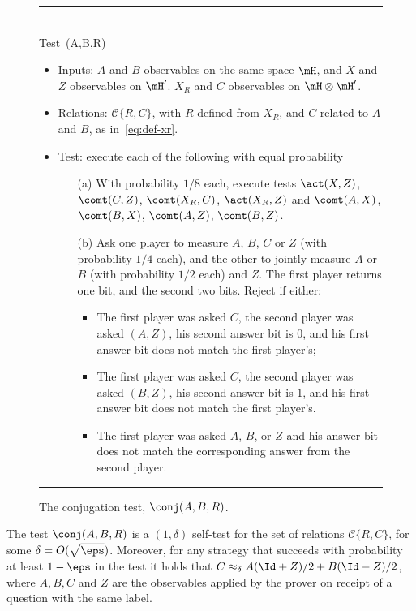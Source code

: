 \begin{figure}[H]
\rule[1ex]{16.5cm}{0.5pt}\\
Test~\conj(A,B,R) 
\begin{itemize}
    \item Inputs: $A$ and $B$ observables on the same space $\mH$, and $X$ and $Z$ observables on $\mH'$. $X_R$ and $C$ observables on $\mH\otimes \mH'$.
    \item Relations:  $\mathcal{C}\{R,C\} $, with $R$ defined from $X_R$, and $C$ related to $A$ and $B$, as in~\eqref{eq:def-xr}. 
    \item Test: execute each of the following with equal probability
		\begin{enumerate}
\item[(a)] With probability $1/8$ each, execute tests $\act(X,Z)$,  $\comt(C,Z)$, $\comt(X_R,C)$,   $\act(X_R,Z)$ and $\comt(A,X)$, $\comt(B,X)$, $\comt(A,Z)$, $\comt(B,Z)$. 
\item[(b)] Ask one player to measure $A$, $B$, $C$ or $Z$ (with probability $1/4$ each), and the other to jointly measure $A$ or $B$ (with probability $1/2$ each) and $Z$. The first player returns one bit, and the second two bits. Reject if either:
\begin{itemize}
\item The first player was asked $C$, the second player was asked $(A,Z)$, his second answer bit is $0$, and his first answer bit does not match the first player's;
\item The first player was asked $C$, the second player was asked $(B,Z)$, his second answer bit is $1$, and his first answer bit does not match the first player's.
\item The first player was asked $A$, $B$, or $Z$ and his answer bit does not match the corresponding answer from the second player.
\end{itemize}
\end{enumerate}
\end{itemize}
\rule[2ex]{16.5cm}{0.5pt}\vspace{-0cm}
\caption{The conjugation test, $\conj(A,B,R)$.}
\label{fig:conjugation-test-1}
\end{figure}

\begin{lemma}\label{lem:conj}
The test $\conj(A,B,R)$ is a $(1,\delta)$ self-test for the set of relations $\mathcal{C}\{R,C\}$, for some $\delta = O(\sqrt{\eps})$. Moreover, for any strategy that succeeds with probability at least $1-\eps$ in the test it holds that $C \approx_{\delta} A (\Id+Z)/2 + B(\Id-Z)/2$, where $A,B,C$ and $Z$ are the observables applied by the prover on receipt of a question with the same label. 
\end{lemma}

